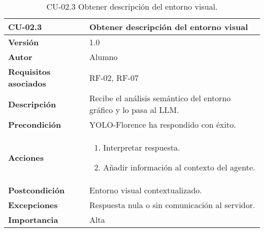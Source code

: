 \begin{table}[p]
    \centering
    \begin{tabularx}{\linewidth}{ p{} p{} }
        \toprule
        \textbf{CU-02.3}    & \textbf{Obtener descripción del entorno visual}\\
        \toprule
        \textbf{Versión}              & 1.0 \\
        \textbf{Autor}                & Alumno \\
        \textbf{Requisitos asociados} & RF-02, RF-07 \\
        \textbf{Descripción}          & Recibe el análisis semántico del entorno gráfico y lo pasa al LLM.\\
        \textbf{Precondición}         & YOLO-Florence ha respondido con éxito.\\
        \textbf{Acciones}             &
        \begin{enumerate}
          \item Interpretar respuesta.
          \item Añadir información al contexto del agente.
        \end{enumerate}\\
        \textbf{Postcondición}        & Entorno visual contextualizado.\\
        \textbf{Excepciones}          & Respuesta nula o sin comunicación al servidor.\\
        \textbf{Importancia}          & Alta \\
        \bottomrule
    \end{tabularx}
    \caption{CU-02.3 Obtener descripción del entorno visual.}
    \label{CU-02.3 Obtenener descripcion del entorno visual}
\end{table}






